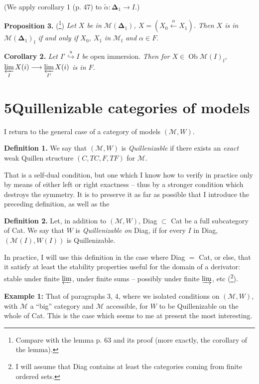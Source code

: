 \documentclass[11pt]{article}
\newcommand{\printedpage}[1]{\marginpar{\footnotesize p.~#1}}
\newcommand{\msp}[1]{\marginpar{\footnotesize [#1]}}
\begin{document}
\printedpage{29}
(We apply corollary 1 (p. 47) to $\tilde{\alpha} : \boldsymbol{\Delta}_1 \longrightarrow I$.)

\textbf{Proposition 3.} (\footnote[28]{Compare with the lemma p. 63 and its proof (more exactly, the corollary of the lemma).}) \textit{Let $X$ be in $\mathcal{M}(\boldsymbol{\Delta}_1)$, $X = (X_0 \xleftarrow{\alpha} X_1)$. Then $X$ is in $\mathcal{M}(\boldsymbol{\Delta}_1)_{\mathrm{f}}$ if and only if $X_0$, $X_1$} \textit{in $\mathcal{M}_{\mathrm{f}}$ and $\alpha \in F$.}

\textbf{Corollary 2.} \textit{Let $I' \overset{u}{\hookrightarrow} I$ be} open immersion. \textit{Then for $X \in \operatorname{Ob}\mathcal{M}(I)_{\mathrm{f}}$, $\varprojlim\limits_{I} X(i) \longrightarrow \varprojlim\limits_{I'} X(i)$ is in $F$.}

\section*{5\quad Quillenizable categories of models}

I return to the general case of a category of models $(\mathcal{M},W)$.

\textbf{Definition 1.} We say that $(\mathcal{M},W)$ is \textit{Quillenizable} if there exists an \textit{exact} weak Quillen structure $(C,TC,F,TF)$ for $\mathcal{M}$.

That is a self-dual condition, but one which I know how to verify in practice only by means of either left or right exactness -- thus by a stronger condition which destroys the symmetry. It is to preserve it as far as possible that I introduce the preceding definition, as well as the

\textbf{Definition 2.} Let, in addition to $(\mathcal{M},W)$, Diag $\subset$ Cat be a full subcategory of Cat. We say that
\msp{page 51}$W$ is \textit{Quillenizable on} Diag, if for every $I$ in Diag, $(\mathcal{M}(I),W(I))$ is Quillenizable.

In practice, I will use this definition in the case where Diag $=$ Cat, or else, that it satisfy at least the stability properties useful for the domain of a derivator: stable under finite $\varprojlim$, under finite sums -- possibly under finite $\varinjlim$, etc (\footnote[29]{I will assume that Diag contains at least the categories coming from finite ordered sets.}). %

\textbf{Example 1:} That of paragraphs 3, 4, where we isolated conditions on $(\mathcal{M},W)$, with $\mathcal{M}$ a ``big'' category and $\mathcal{M}$ accessible, for $W$ to be Quillenizable on the whole of Cat. This is the case which seems to me at present the most interesting.
\end{document}
